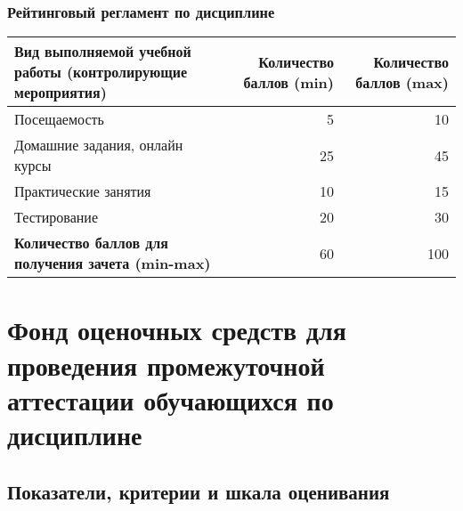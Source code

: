 \documentclass[a4paper,12pt]{article}
\begin{document}
\subsubsection*{Рейтинговый регламент по дисциплине}
\begin{longtable}{|>{\raggedright\arraybackslash}p{110mm}|r|r|}
\hline
\centering\arraybackslash Вид выполняемой учебной работы (контролирующие мероприятия) & 
\multicolumn{1}{p{20mm}|}{\centering\arraybackslash Количество баллов (min)} & 
\multicolumn{1}{p{20mm}|}{\centering\arraybackslash Количество баллов (max)} \\
\hline
Посещаемость & 5 & 10 \\ 
\hline
Домашние задания, онлайн курсы & 25 & 45 \\ 
\hline
Практические занятия & 10 & 15 \\ 
\hline
Тестирование & 20 & 30 \\ 
\hline
{\bf Количество баллов для получения зачета (min-max)} & 60 & 100 \\ 

\hline
\end{longtable}

\newpage
\section{Фонд оценочных средств для проведения промежуточной аттестации обучающихся по дисциплине}

\subsection{Показатели, критерии и шкала оценивания}
\end{document}

